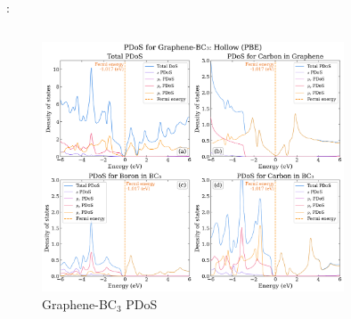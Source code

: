 \documentclass[xcolor=dvipsnames]{beamer}
\begin{document}
\begin{frame}{\insertsection: \insertsubsection}
\begin{columns}
\begin{column}{0.55\textwidth}
\begin{figure}
        \includegraphics[width=0.8\textwidth]{PDoS/G-BC3_pdos.png}
        \caption{Graphene-BC$_\text{3}$ PDoS}
    \end{figure}\end{column}
\end{columns}
\end{frame}
\end{document}
